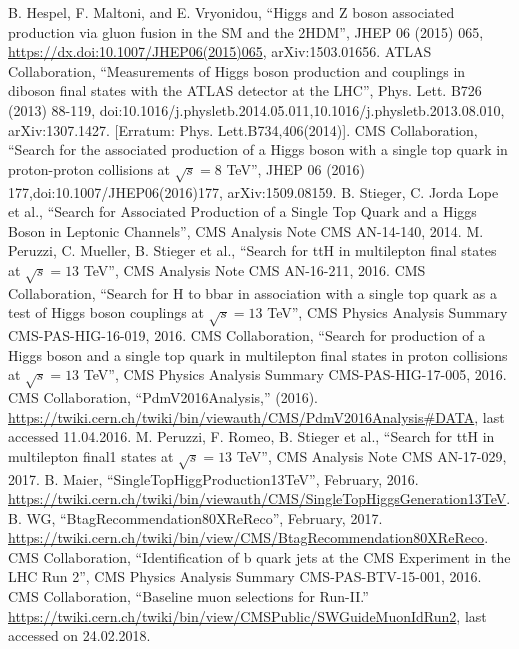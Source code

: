 \documentclass[print]{nuthesis}
\begin{document}
\begin{thebibliography}{300}
  
 B. Hespel, F. Maltoni, and E. Vryonidou, ``Higgs and Z boson associated production via gluon fusion in the SM and the 2HDM'', JHEP 06 (2015) 065, \url{https://dx.doi:10.1007/JHEP06(2015)065}, arXiv:1503.01656.
 ATLAS Collaboration, ``Measurements of Higgs boson production and couplings in diboson final states with the ATLAS detector at the LHC'', Phys. Lett. B726 (2013) 88-119, doi:10.1016/j.physletb.2014.05.011,10.1016/j.physletb.2013.08.010, arXiv:1307.1427. [Erratum: Phys. Lett.B734,406(2014)].
CMS Collaboration, ``Search for the associated production of a Higgs boson with a single top quark in proton-proton collisions at  $\sqrt{s}=8 $ TeV'', JHEP 06 (2016) 177,doi:10.1007/JHEP06(2016)177, arXiv:1509.08159.
B. Stieger, C. Jorda Lope et al., ``Search for Associated Production of a Single Top Quark and a Higgs Boson in Leptonic Channels'', CMS Analysis Note CMS AN-14-140, 2014.
M. Peruzzi, C. Mueller, B. Stieger et al., ``Search for ttH in multilepton final states at $\sqrt{s}=13$ TeV'', CMS Analysis Note CMS AN-16-211, 2016.
CMS Collaboration, ``Search for H to bbar in association with a single top quark as a test of Higgs boson couplings at $\sqrt{s}=13$ TeV'', CMS Physics Analysis Summary CMS-PAS-HIG-16-019, 2016.
CMS Collaboration, ``Search for production of a Higgs boson and a single top quark in multilepton final states in proton collisions at $\sqrt{s}=13$ TeV'', CMS Physics Analysis Summary CMS-PAS-HIG-17-005, 2016.
 CMS Collaboration, ``PdmV2016Analysis,'' (2016). \url{https://twiki.cern.ch/twiki/bin/viewauth/CMS/PdmV2016Analysis#DATA}, last accessed 11.04.2016.
 M. Peruzzi, F. Romeo, B. Stieger et al., ``Search for ttH in multilepton final1 states at $\sqrt{s}=13$ TeV'', CMS Analysis Note CMS AN-17-029, 2017.
 B. Maier, ``SingleTopHiggProduction13TeV'', February, 2016. \url{https://twiki.cern.ch/twiki/bin/viewauth/CMS/SingleTopHiggsGeneration13TeV}.
 B. WG, ``BtagRecommendation80XReReco'', February, 2017. \url{https://twiki.cern.ch/twiki/bin/view/CMS/BtagRecommendation80XReReco}.
 CMS Collaboration, ``Identification of b quark jets at the CMS Experiment in the LHC Run 2'', CMS Physics Analysis Summary CMS-PAS-BTV-15-001, 2016.
 CMS Collaboration, ``Baseline muon selections for Run-II.'' \url{https://twiki.cern.ch/twiki/bin/view/CMSPublic/SWGuideMuonIdRun2}, last accessed on 24.02.2018.

\end{thebibliography}
\end{document}
